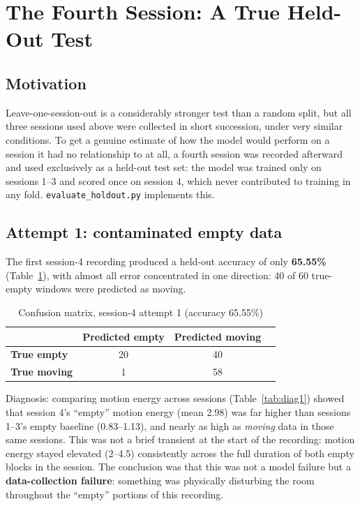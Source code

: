 \documentclass[11pt,a4paper]{article}
\begin{document}
\section{The Fourth Session: A True Held-Out Test}
\label{sec:heldout}

\subsection{Motivation}

Leave-one-session-out is a considerably stronger test than a random
split, but all three sessions used above were collected in short
succession, under very similar conditions. To get a genuine estimate of
how the model would perform on a session it had no relationship to at
all, a fourth session was recorded afterward and used exclusively as a
held-out test set: the model was trained only on sessions 1--3 and
scored once on session 4, which never contributed to training in any
fold. \texttt{evaluate\_holdout.py} implements this.

\subsection{Attempt 1: contaminated empty data}

The first session-4 recording produced a held-out accuracy of only
\textbf{65.55\%} (Table~\ref{tab:holdout1}), with almost all error
concentrated in one direction: 40 of 60 true-empty windows were
predicted as moving.

\begin{table}[h]
\centering
\begin{tabular}{lccc}
\toprule
 & \textbf{Predicted empty} & \textbf{Predicted moving} \\
\midrule
\textbf{True empty}  & 20 & 40 \\
\textbf{True moving} & 1  & 58 \\
\bottomrule
\end{tabular}
\caption{Confusion matrix, session-4 attempt 1 (accuracy 65.55\%)}
\label{tab:holdout1}
\end{table}

Diagnosis: comparing motion energy across sessions
(Table~\ref{tab:diag1}) showed that session 4's ``empty'' motion energy
(mean 2.98) was far higher than sessions 1--3's empty baseline
(0.83--1.13), and nearly as high as \emph{moving} data in those same
sessions. This was not a brief transient at the start of the recording:
motion energy stayed elevated (2--4.5) consistently across the full
duration of both empty blocks in the session. The conclusion was that
this was not a model failure but a \textbf{data-collection failure}:
something was physically disturbing the room throughout the ``empty''
portions of this recording.
\end{document}
